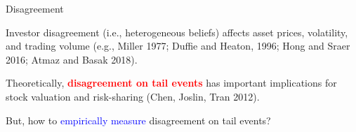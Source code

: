 \documentclass[11pt, aspectratio=169]{beamer}
\newenvironment{wideitemize}{\itemize\addtolength{\itemsep}{10pt}}{\enditemize}
\begin{document}
\begin{frame}{Disagreement}
  \begin{wideitemize}
  \item Investor disagreement (i.e., heterogeneous beliefs) affects asset prices, volatility, and trading volume
    (e.g., Miller 1977;  Duffie and Heaton, 1996; Hong and Sraer 2016; Atmaz and Basak 2018).

  \item Theoretically, \textcolor{red}{\textbf{disagreement on tail events}} has important implications for stock valuation and risk-sharing (Chen, Joslin, Tran 2012).


  \item But, how to \textcolor{blue}{empirically measure} disagreement on tail events?
  \end{wideitemize}
\end{frame}
\end{document}

